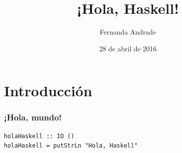 \documentclass{beamer}
\title{¡Hola, Haskell!}
\author{Fernanda Andrade}
\institute{Stack Builders}
\date{28 de abril de 2016}
\begin{document}
  {%
    \frame{\titlepage}
  }



\section{Introducción}

\begin{frame}[fragile]
  \frametitle{¡Hola, mundo!}

\begin{lstlisting}
holaHaskell :: IO ()
holaHaskell = putStrLn "Hola, Haskell"
\end{lstlisting}


\end{frame}

\end{document}
